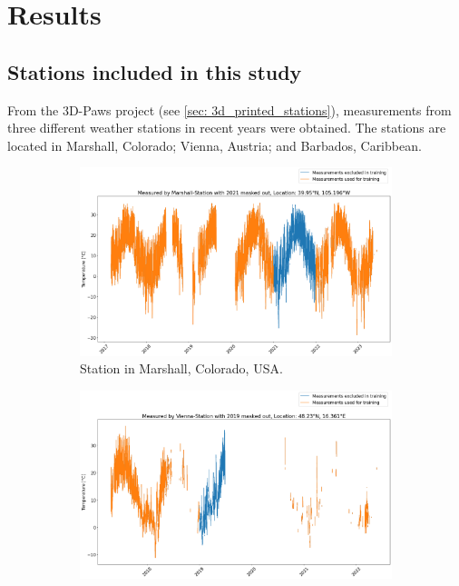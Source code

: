 \section{Results}
\label{sec: results}

\subsection{Stations included in this study}

From the 3D-Paws project (see \autoref{sec: 3d_printed_stations}), measurements from three different weather stations in recent years were obtained. The stations are located in Marshall, Colorado; Vienna, Austria; and Barbados, Caribbean.

\begin{figure}
\centering
\begin{subfigure}{0.672\textwidth}
\includegraphics[width=\textwidth]{resources/images/charts/marshall_available_measurements.png}
\caption{Station in Marshall, Colorado, USA.}
\label{fig: available_measurements_marshall}
\end{subfigure}
\begin{subfigure}{0.672\textwidth}
\includegraphics[width=\textwidth]{resources/images/charts/vienna_available_measurements.png}

\end{subfigure}
\end{figure}
